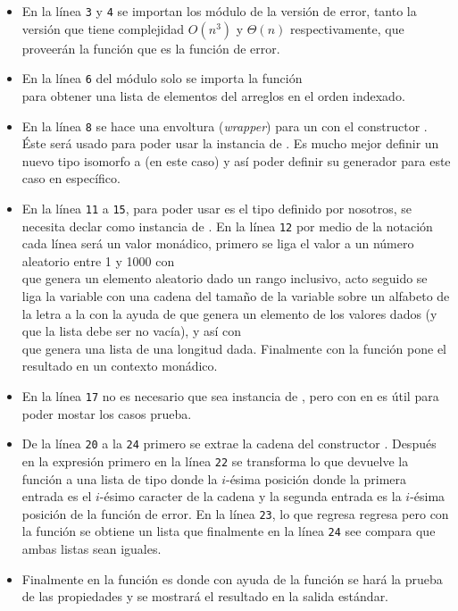 \begin{itemize}
\item En la línea \texttt{3} y \texttt{4} se importan los módulo de la versión de error, tanto
la versión que tiene complejidad $O(n^3)$ y $\Theta(n)$ respectivamente, que proveerán la función
 que es la función de error.
\item En la línea \texttt{6} del módulo  solo se importa la función\\
 para obtener una lista de elementos del arreglos en el orden
indexado.
\item En la línea \texttt{8} se hace una envoltura (\emph{wrapper}) para un  con el
constructor . Éste será usado para poder usar la instancia de .
Es mucho mejor definir un nuevo tipo isomorfo a (en este caso)  y así poder definir
su generador para este caso en específico.
\item En la línea \texttt{11} a \texttt{15}, para poder usar  es el tipo
 definido por nosotros, se necesita declar como instancia de .
En la línea \texttt{12} por medio de la notación  cada línea será un valor monádico,
primero se liga el valor  a un número aleatorio entre 1 y 1000 con\\
 que genera un elemento aleatorio dado un rango
inclusivo, acto seguido se liga la variable  con una cadena del tamaño de la variable
 sobre un alfabeto de la letra  a la  con la ayuda de
 que genera un elemento de los valores dados (y que la lista debe
ser no vacía), y así con\\
 que genera una lista de una longitud dada. Finalmente
con la función  pone el resultado en un contexto monádico.
\item En la línea \texttt{17} no es necesario que sea instancia de , pero con
 en  es útil para poder mostar los casos prueba.
\item De la línea \texttt{20} a la \texttt{24} primero se extrae la cadena  del
constructor . Después en la expresión  primero en la línea
\texttt{22} se transforma lo que devuelve la función  a una lista de tipo
 donde la $i$-ésima posición donde la primera entrada es el $i$-ésimo
caracter de la cadena y la segunda entrada es la $i$-ésima posición de la función de error.
En la línea \texttt{23}, lo que regresa  regresa
 pero con la función  se obtiene un lista que finalmente
en la línea \texttt{24} see compara que ambas listas sean iguales.
\item Finalmente en la función  es donde con ayuda de la función 
se hará la prueba de las propiedades y se mostrará el resultado en la salida estándar.
\end{itemize}

